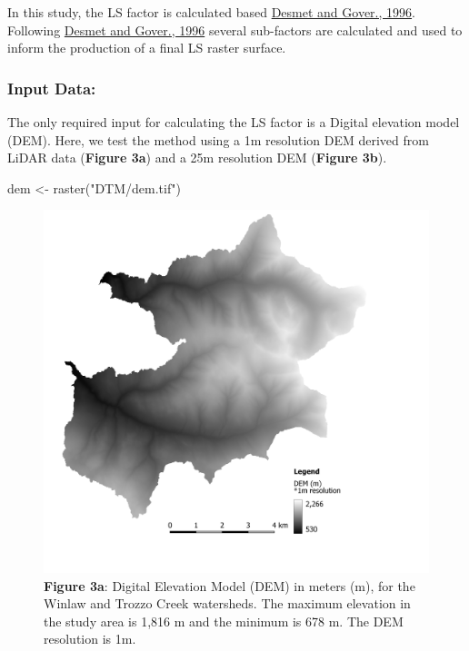 \documentclass[
]{article}
\newenvironment{Shaded}{\begin{snugshade}}{\end{snugshade}}
\newcommand{\FunctionTok}[1]{\textcolor[rgb]{0.00,0.00,0.00}{#1}}
\newcommand{\NormalTok}[1]{#1}
\newcommand{\OtherTok}[1]{\textcolor[rgb]{0.56,0.35,0.01}{#1}}
\newcommand{\StringTok}[1]{\textcolor[rgb]{0.31,0.60,0.02}{#1}}
\begin{document}
In this study, the LS factor is calculated based \href{https://www.researchgate.net/publication/233425999_A_GIS_procedure_for_automatically_calculating_the_USLE_LS_factor_on_topographically_complex_landscape_units}{Desmet and Gover., 1996}. Following \href{https://www.researchgate.net/publication/233425999_A_GIS_procedure_for_automatically_calculating_the_USLE_LS_factor_on_topographically_complex_landscape_units}{Desmet and Gover., 1996} several sub-factors are calculated and used to inform the production of a final LS raster surface.

\hypertarget{sec-ls-input-data}{%
\subsubsection*{Input Data:}\label{sec-ls-input-data}}

The only required input for calculating the LS factor is a Digital elevation model (DEM). Here, we test the method using a 1m resolution DEM derived from LiDAR data (\textbf{Figure 3a}) and a 25m resolution DEM (\textbf{Figure 3b}).

\begin{Shaded}
\begin{Highlighting}[]
\NormalTok{dem }\OtherTok{\textless{}{-}} \FunctionTok{raster}\NormalTok{(}\StringTok{"DTM/dem.tif"}\NormalTok{)}
\end{Highlighting}
\end{Shaded}

\begin{figure}
\centering
\includegraphics{img/dem_1m.png}
\caption{\textbf{Figure 3a}: Digital Elevation Model (DEM) in meters (m), for the Winlaw and Trozzo Creek watersheds. The maximum elevation in the study area is 1,816 m and the minimum is 678 m. The DEM resolution is 1m.}
\end{figure}
\end{document}
